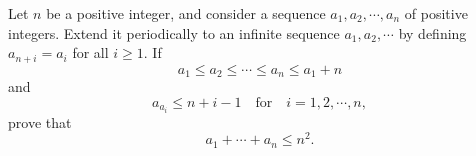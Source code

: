 Let 
$n$
 be a positive integer, and consider a sequence 
$a_1 , a_2 , \cdots , a_n $
 of positive integers. Extend it periodically to an infinite sequence 
$a_1 , a_2 , \cdots $
 by defining 
$a_{n+i} = a_i $
 for all 
$i \ge 1$.
 If 
\[a_1 \le a_2 \le \cdots \le a_n \le a_1 +n  \]
 and 
\[a_{a_i } \le n+i-1 \quad\text{for}\quad i=1,2,\cdots, n, \]
 prove that 
\[a_1 + \cdots +a_n \le n^2. \]
